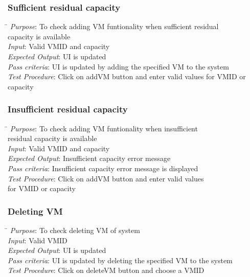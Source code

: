 \documentclass[a4paper,10pt]{article}
\begin{document}
\subsubsection{Sufficient residual capacity}
\begin{tabbing}
 \hspace*{4cm}\= \kill
 \emph{Purpose}\>: To check adding VM funtionality when sufficient residual \\ \>capacity is available\\
 \emph{Input}\>: Valid VM\textunderscore ID and capacity\\
 \emph{Expected Output}\>: UI is updated\\
 \emph{Pass criteria}\>: UI is updated by adding the specified VM to the system\\
 \emph{Test Procedure}\>: Click on addVM button and enter valid values for VM\textunderscore ID or capacity\\
\end{tabbing}
\subsubsection{Insufficient residual capacity}
\begin{tabbing}
 \hspace*{4cm}\= \kill
 \emph{Purpose}\>: To check adding VM funtionality when insufficient \\ \>residual capacity is available\\
 \emph{Input}\>: Valid VM\textunderscore ID and capacity\\
 \emph{Expected Output}\>: Insufficient capacity error message \\
 \emph{Pass criteria}\>: Insufficient capacity error message is displayed\\
 \emph{Test Procedure}\>: Click on addVM button and enter valid values \\ \>for VM\textunderscore ID or capacity\\
\end{tabbing}
\subsubsection{Deleting VM}
\begin{tabbing}
 \hspace*{4cm}\= \kill
 \emph{Purpose}\>: To check deleting VM of system\\
 \emph{Input}\>: Valid VM\textunderscore ID \\
 \emph{Expected Output}\>: UI is updated\\
 \emph{Pass criteria}\>: UI is updated by deleting the specified VM to the system\\
 \emph{Test Procedure}\>: Click on deleteVM button and choose a VM\textunderscore ID \\
\end{tabbing}
\end{document}
